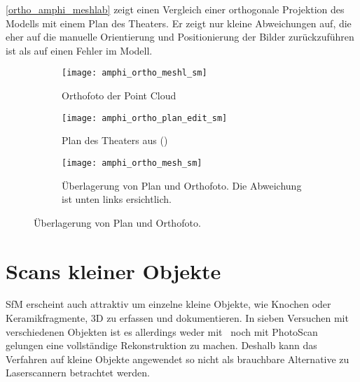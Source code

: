 				\autoref{ortho_amphi_meshlab} zeigt einen Vergleich einer orthogonale Projektion des Modells mit einem Plan des Theaters. Er zeigt nur kleine Abweichungen auf, die eher auf die manuelle Orientierung und Positionierung der Bilder zurückzuführen ist als auf einen Fehler im Modell.
				\begin{figure}
					\vspace*{-3cm}
					\begin{subfigure}{0.4\textwidth}
						\texttt{[image: amphi\_ortho\_meshl\_sm]}
						\caption{Orthofoto der Point Cloud}
					\end{subfigure}	
					\begin{subfigure}{0.4\textwidth}
						\texttt{[image: amphi\_ortho\_plan\_edit\_sm]}
						\caption{Plan des Theaters aus (\cite{engehalb})}
					\end{subfigure}
					\begin{subfigure}{\textwidth}
						\texttt{[image: amphi\_ortho\_mesh\_sm]}
						\caption{Überlagerung von Plan und Orthofoto. Die Abweichung ist unten links ersichtlich.}
					\end{subfigure}
					\caption[Überlagerung von Plan und Orthofoto. Plan aus (\cite{engehalb})]{Überlagerung von Plan und Orthofoto.}
					\label{ortho_amphi_meshlab}
				\end{figure}
				
			
	\section{Scans kleiner Objekte}
		SfM erscheint auch attraktiv um einzelne kleine Objekte, wie Knochen oder Keramikfragmente, 3D zu erfassen und dokumentieren. In sieben Versuchen mit verschiedenen Objekten ist es allerdings weder mit \dronarch\ noch mit PhotoScan gelungen eine vollständige Rekonstruktion zu machen. Deshalb kann das Verfahren auf kleine Objekte angewendet so nicht als brauchbare Alternative zu Laserscannern betrachtet werden.
		